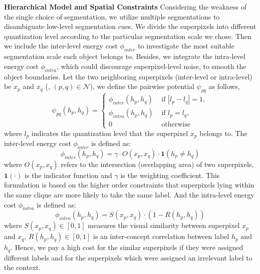 \textbf{Hierarchical Model and Spatial Constraints}
Considering the weakness of the single choice of segmentation, we utilize multiple segmentations to disambiguate low-level segmentation cues.
We divide the superpixels into different quantization level according to the particular segmentation scale we chose.
Then we include the inter-level energy cost $\phi_{inter}$ to investigate the most suitable segmentation scale each object belongs to.
Besides, we integrate the intra-level energy cost $\phi_{intra}$, which could discourage superpixel-level noise, to smooth the object boundaries.
Let the two neighboring superpixels (inter-level or intra-level) be $x_p$ and $x_q$ (\ie, $(p,q) \in \mathcal{N}$), we define the pairwise potential $\psi_{pq}$ as follows,
\begin{equation}
    \psi_{pq}(h_p,h_q) =
    \begin{cases}
        \phi_{inter}(h_p,h_q) &\mbox{ if } | l_p - l_q | = 1,
        \\
        \phi_{intra}(h_p,h_q) &\mbox{ if } l_p = l_q,
        \\
        0 &\mbox{ otherwise }
    \end{cases}
\end{equation}
where $l_p$ indicates the quantization level that the superpixel $x_p$ belongs to.
The inter-level energy cost $\phi_{inter}$ is defined as:
\begin{equation}
    \phi_{inter}(h_p,h_q) = \gamma \cdot O(x_p,x_q) \cdot \mathbf{1}(h_p \neq h_q)
\end{equation}
where $O(x_p,x_q)$ refers to the intersection (overlapping area) of two superpixels, $\mathbf{1}(\cdot)$ is the indicator function and $\gamma$ is the weighting coefficient.
This formulation is based on the higher order constraints \cite{kohli2009robust,ladicky2009associative} that superpixels lying within the same clique are more likely to take the same label.
And the intra-level energy cost $\phi_{intra}$ is defined as:
\begin{equation}
    \phi_{intra}(h_p,h_q) = S(x_p,x_q) \cdot (1-R(h_p,h_q))
\end{equation}
where $S(x_p,x_q) \in [0,1]$ measures the visual similarity between superpixel $x_p$ and $x_q$, $R(h_p,h_q) \in [0,1]$ is an inter-concept correlation between label $h_p$ and $h_q$.
Hence, we pay a high cost for the similar superpixels if they were assigned different labels and for the superpixels which were assigned an irrelevant label to the context.


